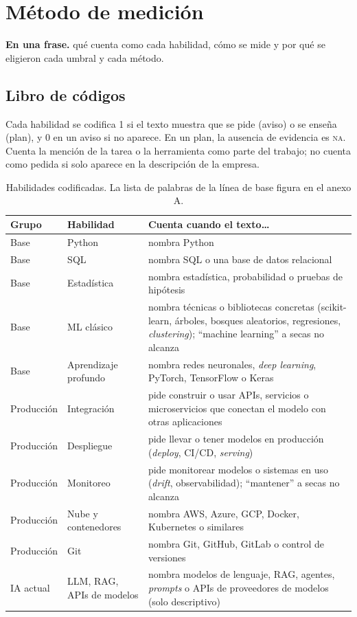 \documentclass[11pt,a4paper]{article}
\newcommand{\NA}{\textsc{na}}
\begin{document}
\section{Método de medición}
\begin{enunasola}\textbf{En una frase.} qué cuenta como cada habilidad, cómo se mide y por qué se eligieron cada umbral y cada método.\end{enunasola}


\subsection{Libro de códigos}
Cada habilidad se codifica 1 si el texto muestra que se pide (aviso) o se enseña (plan), y 0 en un aviso si no aparece. En un plan, la ausencia de evidencia es \NA{}. Cuenta la mención de la tarea o la herramienta como parte del trabajo; no cuenta como pedida si solo aparece en la descripción de la empresa.

\begin{table}[H]
\centering\small
\begin{tabularx}{\textwidth}{L{2.4cm} L{2.4cm} X}
\toprule
{}\textbf{Grupo} & \textbf{Habilidad} & \textbf{Cuenta cuando el texto\ldots}\\
\midrule
Base & Python & nombra Python\\
Base & SQL & nombra SQL o una base de datos relacional\\
Base & Estadística & nombra estadística, probabilidad o pruebas de hipótesis\\
Base & ML clásico & nombra técnicas o bibliotecas concretas (scikit-learn, árboles, bosques aleatorios, regresiones, \emph{clustering}); ``machine learning'' a secas no alcanza\\
Base & Aprendizaje profundo & nombra redes neuronales, \emph{deep learning}, PyTorch, TensorFlow o Keras\\
Producción & Integración & pide construir o usar APIs, servicios o microservicios que conectan el modelo con otras aplicaciones\\
Producción & Despliegue & pide llevar o tener modelos en producción (\emph{deploy}, CI/CD, \emph{serving})\\
Producción & Monitoreo & pide monitorear modelos o sistemas en uso (\emph{drift}, observabilidad); ``mantener'' a secas no alcanza\\
Producción & Nube y contenedores & nombra AWS, Azure, GCP, Docker, Kubernetes o similares\\
Producción & Git & nombra Git, GitHub, GitLab o control de versiones\\
IA actual & LLM, RAG, APIs de modelos & nombra modelos de lenguaje, RAG, agentes, \emph{prompts} o APIs de proveedores de modelos (solo descriptivo)\\
\bottomrule
\end{tabularx}
\caption{Habilidades codificadas. La lista de palabras de la línea de base figura en el anexo A.}
\end{table}
\end{document}
